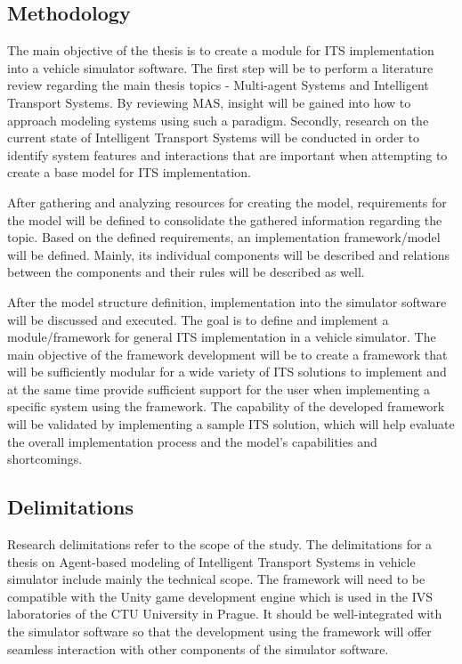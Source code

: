 \documentclass[titlepage, 12pt]{article}
\begin{document}

\subsection{Methodology}

The main objective of the thesis is to create a module for ITS implementation into a vehicle simulator software. 
The first step will be to perform a literature review regarding the main thesis topics - Multi-agent Systems and 
Intelligent Transport Systems. By reviewing MAS, insight will be gained into how to approach modeling systems using 
such a paradigm. Secondly, research on the current state of Intelligent Transport Systems will be conducted in 
order to identify system features and interactions that are important when attempting to create a 
base model for ITS implementation. 

After gathering and analyzing resources for creating the model, requirements for the model will be defined to consolidate 
the gathered information regarding the topic. Based on the defined requirements, an implementation framework/model will be 
defined. Mainly, its individual components will be described and relations between the components and their rules will be 
described as well. 

After the model structure definition, implementation into the simulator software will be discussed and executed. 
The goal is to define and implement a module/framework for general ITS implementation in a vehicle simulator. 
The main objective of the framework development will be to create a framework that will be sufficiently modular for 
a wide variety of ITS solutions to implement and at the same time provide sufficient support for the user when 
implementing a specific system using the framework. The capability of the developed framework will be validated
by implementing a sample ITS solution, which will help evaluate the overall implementation process and the 
model's capabilities and shortcomings.

\subsection{Delimitations}

Research delimitations refer to the scope of the study. The delimitations
for a thesis on Agent-based modeling of Intelligent Transport Systems in vehicle simulator include mainly 
the technical scope. The framework will need to be compatible with the Unity game development engine which 
is used in the IVS laboratories of the CTU University in Prague. It should be well-integrated with the simulator software so that 
the development using the framework will offer seamless interaction with other components of the simulator software. 
\end{document}
